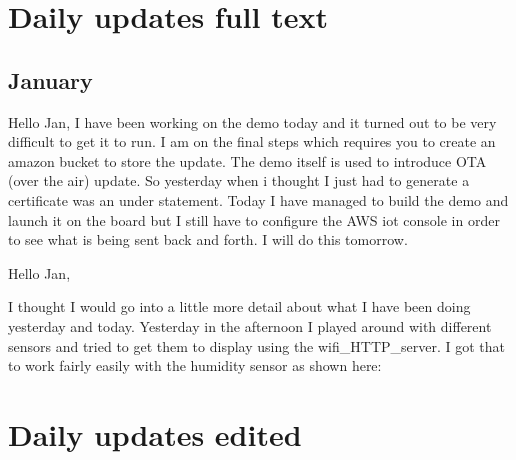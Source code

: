 \section{Daily updates full text}
 
\subsection{January}
Hello Jan,
I have been working on the demo today and it turned out to be very difficult to get it to run. I am on the final steps which requires you to create an amazon bucket to 
store the update. The demo itself is used to  introduce OTA (over the air) update. So yesterday when i thought I just had to generate a certificate was an under statement. 
Today I have managed to build the demo and 
launch it on the board but I still have to configure the AWS iot console in order to see what is being sent back and forth. I will do this tomorrow. 

Hello Jan,

I thought I would go into a little more detail about what I have been doing yesterday and today. Yesterday in the afternoon I played around with different sensors and tried to get them to display using the wifi_HTTP_server. I got that to work fairly easily with the humidity sensor as shown here:




\section{Daily updates edited}
